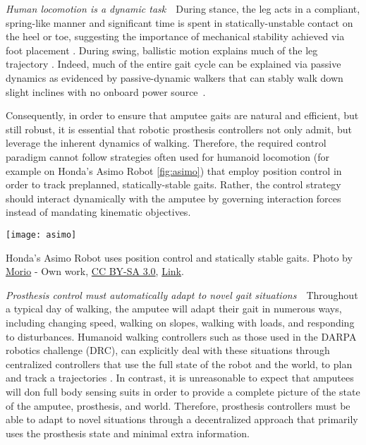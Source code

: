 \begin{challenges}
    \item\label{chal:dynamic} \emph{Human locomotion is a dynamic task}~~During
    stance, the leg acts in a compliant, spring-like manner
    \citep{geyer2006compliant} and significant time is spent in
    statically-unstable contact on the heel or toe, suggesting the importance of
    mechanical stability achieved via foot placement \citep{perry2010gait}.
    During swing, ballistic motion explains much of the leg trajectory
    \citep{mochon1980ballistic}. Indeed, much of the entire gait cycle can be
    explained via passive dynamics as evidenced by passive-dynamic walkers that
    can stably walk down slight inclines with no onboard power
    source~\citep{mcgeer1990passive, collins2005efficient}.

    Consequently, in order to ensure that amputee gaits are natural and
    efficient, but still robust, it is essential that robotic prosthesis
    controllers not only admit, but leverage the inherent dynamics of walking.
    Therefore, the required control paradigm cannot follow strategies often used
    for humanoid locomotion (for example on Honda's Asimo Robot
    \cref{fig:asimo}) that employ position control in order to track preplanned,
    statically-stable gaits. Rather, the control strategy should interact
    dynamically with the amputee by governing interaction forces instead of
    mandating kinematic objectives.

    \begin{marginfigure}
        \centering
        \texttt{[image: asimo]}
        \caption{Honda's Asimo Robot uses position control and statically stable
        gaits. Photo by
        \href{http://commons.wikimedia.org/wiki/User:Morio}{Morio} - Own work,
        \href{http://creativecommons.org/licenses/by-sa/3.0}{CC BY-SA 3.0},
        \href{https://commons.wikimedia.org/w/index.php?curid=29969316}{Link}.}
        \label{fig:asimo}
    \end{marginfigure}

    \item\label{chal:adaptability} \emph{Prosthesis control must automatically
    adapt to novel gait situations}~~Throughout a typical day of walking, the
    amputee will adapt their gait in numerous ways, including changing speed,
    walking on slopes, walking with loads, and responding to disturbances.
    Humanoid walking controllers such as those used in the DARPA robotics
    challenge (DRC), can explicitly deal with these situations through
    centralized controllers that use the full state of the robot and the world,
    to plan and track a trajectories \citep{feng2015optimization,
    kuindersma2014efficiently, englsberger2014trajectory}. In contrast, it is
    unreasonable to expect that amputees will don full body sensing suits in
    order to provide a complete picture of the state of the amputee, prosthesis,
    and world. Therefore, prosthesis controllers must be able to adapt to novel
    situations through a decentralized approach that primarily uses the
    prosthesis state and minimal extra information.


\end{challenges}
